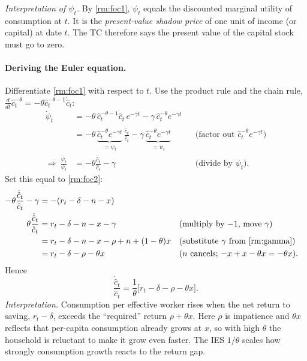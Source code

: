 \emph{Interpretation of $\psi_t$.} By \eqref{rm:foc1}, $\psi_t$ equals the discounted marginal utility of consumption at $t$. It is the \emph{present-value shadow price} of one unit of income (or capital) at date $t$. The TC therefore says the present value of the capital stock must go to zero.

\paragraph{Deriving the Euler equation.} Differentiate \eqref{rm:foc1} with respect to $t$. Use the product rule and the chain rule, $\frac{d}{dt}\hat c_t^{-\theta}=-\theta\hat c_t^{-\theta-1}\dot{\hat c}_t$:
\begin{align*}
\dot\psi_t&=-\theta\,\hat c_t^{-\theta-1}\dot{\hat c}_t\,e^{-\gamma t}-\gamma\,\hat c_t^{-\theta}e^{-\gamma t}\\
&=-\theta\,\underbrace{\hat c_t^{-\theta}e^{-\gamma t}}_{=\psi_t}\,\frac{\dot{\hat c}_t}{\hat c_t}-\gamma\,\underbrace{\hat c_t^{-\theta}e^{-\gamma t}}_{=\psi_t}
&&\text{(factor out $\hat c_t^{-\theta}e^{-\gamma t}$)}\\
\Rightarrow\ \frac{\dot\psi_t}{\psi_t}&=-\theta\frac{\dot{\hat c}_t}{\hat c_t}-\gamma
&&\text{(divide by $\psi_t$).}
\end{align*}
Set this equal to \eqref{rm:foc2}:
\begin{align*}
-\theta\frac{\dot{\hat c}_t}{\hat c_t}-\gamma&=-(r_t-\delta-n-x)\\
\theta\frac{\dot{\hat c}_t}{\hat c_t}&=r_t-\delta-n-x-\gamma
&&\text{(multiply by $-1$, move $\gamma$)}\\
&=r_t-\delta-n-x-\rho+n+(1-\theta)x
&&\text{(substitute $\gamma$ from \eqref{rm:gamma})}\\
&=r_t-\delta-\rho-\theta x
&&\text{($n$ cancels; $-x+x-\theta x=-\theta x$).}
\end{align*}
Hence
\begin{equation}
\frac{\dot{\hat c}_t}{\hat c_t}=\frac1\theta\big[r_t-\delta-\rho-\theta x\big]. \label{rm:euler0}
\end{equation}
\emph{Interpretation.} Consumption per effective worker rises when the net return to saving, $r_t-\delta$, exceeds the ``required'' return $\rho+\theta x$. Here $\rho$ is impatience and $\theta x$ reflects that per-capita consumption already grows at $x$, so with high $\theta$ the household is reluctant to make it grow even faster. The IES $1/\theta$ scales how strongly consumption growth reacts to the return gap.


